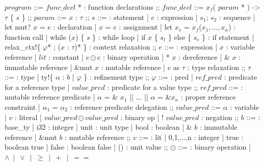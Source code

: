 \documentclass[twoside, english]{sdqthesis}
\newcommand{\ccolon}[0]{: }
\newcommand{\cmid}[0]{| }
\newcommand{\cdisj}[0]{|| }
\theoremstyle{definition}
\begin{document}
\begin{bnfgrammar}
  $program$  ::=
    $func\_decl$ * : function declarations
  ;;
  $func\_decl$ ::=
    $x_f$( $param$ * ) -> $\tau$ \{ $s$ \}
  ;;
  $param$ ::= $x$ \ccolon  $\tau$
  ;;
  $s$
  ::=                                                     : statement
    | $e$                                                 : expression
    | $s_1$; $s_2$                                        : sequence
    | let mut? $x$ = $e$                                  : declaration
    | $x$ = $e$                                           : assignment
    | let $x_v$ = $x_f$($x_1, \dots, x_n$)                : function call
    | while ($x$) \{ $s$ \}                               : while loop
    | if $x$ \{ $s_t$ \} else \{ $s_e$ \}               : if statement
    | relax\_ctx!\{ $\varphi$* ; ($x$ \ccolon $\tau$)* \} : context relaxation
  ;;
  $e$
  ::=                                                     : expression 
    | $x$                                                 : variable reference
    | $lit$                                               : constant
    | $e \odot e$                                         : binary operation
    | * $x$                                               : dereference
  | \& $x$                                                : immutable reference
  | \&mut $x$                                             : mutable reference
    | $e$ as $\tau$                                       : type relaxation
  ;;
  $\tau$
  ::=                                                     : type 
  | ty!\{ $\alpha$ \ccolon $b$ \cmid $\varphi$ \}         : refinement type
  ;;
  $\varphi$
    ::=                                                   : pred 
    | $ref\_pred$                                         : predicate for a reference type
    | $value\_pred$                                       : predicate for a value type
  ;;
  $ref\_pred$ ::=                                                   : mutable reference predicate
    | $\alpha$ = \& $x_1$ \cdisj ... \cdisj $\alpha$ = \&$x_n$  : proper reference constraint
    | $\alpha_1$ = $\alpha_2$                                       : reference predicate delegation
  ;;
  $value\_pred$ ::=
    $\alpha$                                 : variable
  | $v$                                      : literal
  | $value\_pred \odot value\_pred$          : binary op
  | ! $value\_pred$                          : negation
  ;;
  $b$
    ::=                     : base\_ty
    | i32                   : integer
    | unit                  : unit type
    | bool                  : boolean
    | \& $b$                : immutable reference
    | \&mut $b$             : mutable reference
  ;;
  $v$
    ::=                     : lit 
    | 0,1,...,n             : integer
    | true                  : boolean true
    | false                 : boolean false
    | ()                    : unit value
  ;;
  $\odot$
    ::=                     : binary operation
    | $\wedge \ \mid \ \vee \ \mid \ \geq \ \mid \ + \ \mid \ ==$
\end{bnfgrammar}
\end{document}
